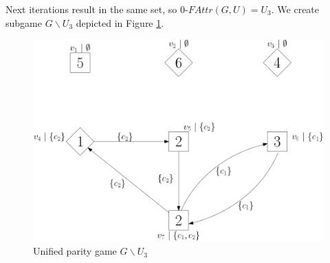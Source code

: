 \begin{example}
Next iterations result in the same set, so $0\textit{-FAttr}(G,U) = U_3$. We create subgame $G\backslash U_3$ depicted in Figure \ref{fig:upg_subattr}.
\begin{figure}[h]
	\centering
	\includegraphics[width=0.7\linewidth]{Examples/VPG/upg_subattr}
	\caption{Unified parity game $G \backslash U_3$}
	\label{fig:upg_subattr}
\end{figure}

\end{example}


